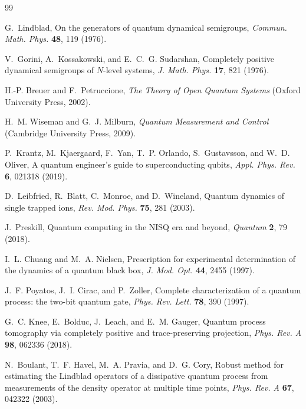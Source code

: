 \documentclass[twocolumn,aps,prxquantum,superscriptaddress,nofootinbib,floatfix,longbibliography]{revtex4-2}
\begin{document}
\begin{thebibliography}{99}
\providecommand{\url}[1]{\texttt{#1}}
\providecommand{\doi}[1]{doi:~#1}

G.~Lindblad, On the generators of quantum dynamical semigroups, \emph{Commun. Math. Phys.} \textbf{48}, 119 (1976).

V.~Gorini, A.~Kossakowski, and E.~C.~G. Sudarshan, Completely positive dynamical semigroups of $N$-level systems, \emph{J. Math. Phys.} \textbf{17}, 821 (1976).

H.-P. Breuer and F.~Petruccione, \emph{The Theory of Open Quantum Systems} (Oxford University Press, 2002).

H.~M. Wiseman and G.~J. Milburn, \emph{Quantum Measurement and Control} (Cambridge University Press, 2009).

P.~Krantz, M.~Kjaergaard, F.~Yan, T.~P. Orlando, S.~Gustavsson, and W.~D. Oliver, A quantum engineer's guide to superconducting qubits, \emph{Appl. Phys. Rev.} \textbf{6}, 021318 (2019).

D.~Leibfried, R.~Blatt, C.~Monroe, and D.~Wineland, Quantum dynamics of single trapped ions, \emph{Rev. Mod. Phys.} \textbf{75}, 281 (2003).

J.~Preskill, Quantum computing in the NISQ era and beyond, \emph{Quantum} \textbf{2}, 79 (2018).

I.~L. Chuang and M.~A. Nielsen, Prescription for experimental determination of the dynamics of a quantum black box, \emph{J. Mod. Opt.} \textbf{44}, 2455 (1997).

J.~F. Poyatos, J.~I. Cirac, and P.~Zoller, Complete characterization of a quantum process: the two-bit quantum gate, \emph{Phys. Rev. Lett.} \textbf{78}, 390 (1997).

G.~C. Knee, E.~Bolduc, J.~Leach, and E.~M. Gauger, Quantum process tomography via completely positive and trace-preserving projection, \emph{Phys. Rev. A} \textbf{98}, 062336 (2018).

N.~Boulant, T.~F. Havel, M.~A. Pravia, and D.~G. Cory, Robust method for estimating the Lindblad operators of a dissipative quantum process from measurements of the density operator at multiple time points, \emph{Phys. Rev. A} \textbf{67}, 042322 (2003).


\end{thebibliography}
\end{document}
